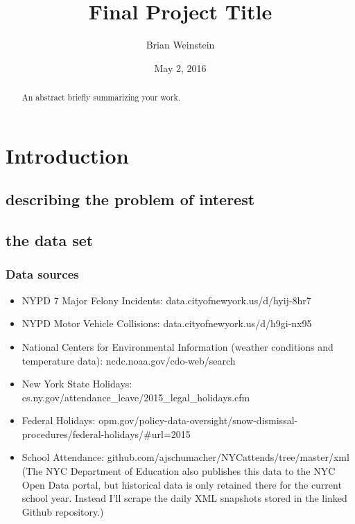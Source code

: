 \documentclass[12pt,notitlepage]{article}
\begin{document}
\title{Final Project Title}
\author{Brian Weinstein}
\date{May 2, 2016}

\maketitle



\begin{abstract}
\singlespacing
An abstract briefly summarizing your work.
\end{abstract}



\pagebreak

\singlespacing



\section{Introduction}


\subsection{describing the problem of interest}


\subsection{the data set}

\subsubsection{Data sources}

\begin{itemize}
\item NYPD 7 Major Felony Incidents: data.cityofnewyork.us/d/hyij-8hr7
\item NYPD Motor Vehicle Collisions: data.cityofnewyork.us/d/h9gi-nx95
\item National Centers for Environmental Information (weather conditions and temperature data): ncdc.noaa.gov/cdo-web/search
\item New York State Holidays: cs.ny.gov/attendance\_leave/2015\_legal\_holidays.cfm
\item Federal Holidays: opm.gov/policy-data-oversight/snow-dismissal-procedures/federal-holidays/\#url=2015
\item School Attendance: github.com/ajschumacher/NYCattends/tree/master/xml
(The NYC Department of Education also publishes this data to the NYC Open Data portal, but historical data is only retained there for the current school year. Instead I’ll scrape the daily XML snapshots stored in the linked Github repository.)
\end{itemize}
\end{document}

